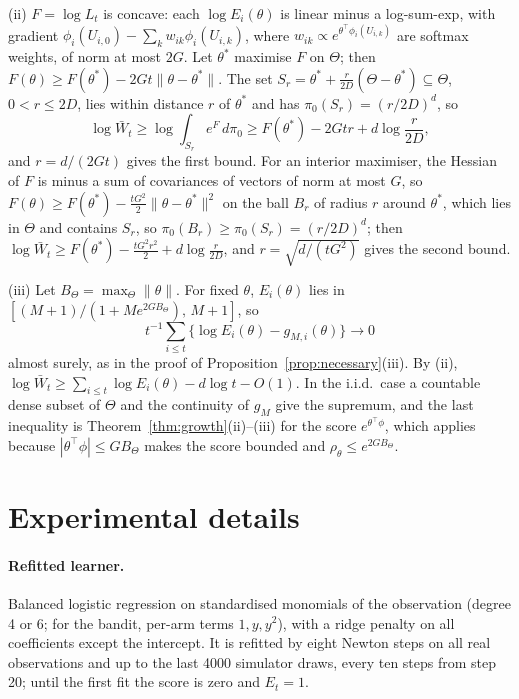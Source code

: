 \documentclass[11pt]{article}
\theoremstyle{remark}
\begin{document}
(ii) $F = \log L_t$ is concave: each $\log E_i(\theta)$ is linear minus a
log-sum-exp, with gradient $\phi_i(U_{i,0}) - \sum_k w_{ik}\phi_i(U_{i,k})$, where
$w_{ik} \propto e^{\theta^\top\phi_i(U_{i,k})}$ are softmax weights, of norm at
most $2G$. Let $\theta^*$ maximise $F$ on $\Theta$; then
$F(\theta) \ge F(\theta^*) - 2Gt\|\theta - \theta^*\|$. The set
$S_r = \theta^* + \frac{r}{2D}(\Theta - \theta^*) \subseteq \Theta$, $0 < r \le 2D$,
lies within distance $r$ of $\theta^*$ and has $\pi_0(S_r) = (r/2D)^d$, so
\[
\log \bar W_t \ge \log\int_{S_r} e^{F}\, d\pi_0 \ge F(\theta^*) - 2Gtr + d \log\frac{r}{2D},
\]
and $r = d/(2Gt)$ gives the first bound. For an interior maximiser, the
Hessian of $F$ is minus a sum of covariances of vectors of norm at most $G$, so
$F(\theta) \ge F(\theta^*) - \frac{tG^2}{2}\|\theta-\theta^*\|^2$ on the ball $B_r$
of radius $r$ around $\theta^*$, which lies in $\Theta$ and contains $S_r$, so
$\pi_0(B_r) \ge \pi_0(S_r) = (r/2D)^d$; then
$\log \bar W_t \ge F(\theta^*) - \frac{tG^2 r^2}{2} + d\log\frac{r}{2D}$, and
$r = \sqrt{d/(tG^2)}$ gives the second bound.

(iii) Let $B_\Theta = \max_\Theta\|\theta\|$. For fixed $\theta$, $E_i(\theta)$
lies in $[(M+1)/(1 + M e^{2GB_\Theta}),\, M+1]$, so
\[
t^{-1}\textstyle\sum_{i\le t}\{\log E_i(\theta) - g_{M,i}(\theta)\} \to 0
\]
almost surely, as in the proof of
Proposition~\ref{prop:necessary}(iii). By (ii),
$\log \bar W_t \ge \sum_{i \le t} \log E_i(\theta) - d\log t - O(1)$. In the
i.i.d.\ case a countable dense subset of $\Theta$ and the continuity of $g_M$
give the supremum, and the last inequality is Theorem~\ref{thm:growth}(ii)--(iii)
for the score $e^{\theta^\top\phi}$, which applies because
$|\theta^\top\phi| \le GB_\Theta$ makes the score bounded and
$\rho_\theta \le e^{2GB_\Theta}$.

\section{Experimental details}\label{app:details}

\paragraph{Refitted learner.} Balanced logistic regression on standardised
monomials of the observation (degree 4 or 6; for the bandit, per-arm terms
$1, y, y^2$), with a ridge penalty on all coefficients except the intercept.
It is refitted by eight Newton steps on all real observations and up to the
last 4000 simulator draws, every ten steps from step 20; until the first fit
the score is zero and $E_t = 1$.
\end{document}
